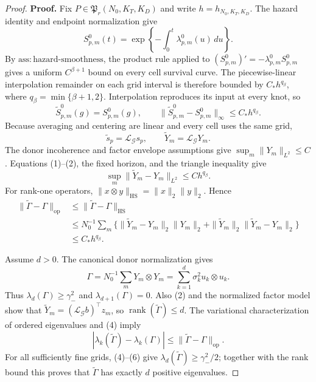 \documentclass{article}
\begin{document}
\begin{proof}
\textbf{Proof.}
Fix \(P\in\mathfrak P_r(N_0,K_T,K_D)\) and write \(h=h_{N_0,K_T,K_D}\). The hazard identity and endpoint normalization give
\[
 S^0_{p,m}(t)=\exp\left\{-\int_0^t\lambda^0_{p,m}(u)\,du\right\}.
\]
By \(\mathrm{ass:hazard\mbox{-}smoothness}\), the product rule applied to \((S^0_{p,m})'=-\lambda^0_{p,m}S^0_{p,m}\) gives a uniform \(C^{\beta+1}\) bound on every cell survival curve. The piecewise-linear interpolation remainder on each grid interval is therefore bounded by \(C_*h^{q_\beta}\), where \(q_\beta=\min\{\beta+1,2\}\). Interpolation reproduces its input at every knot, so
\[
 \widetilde S^0_{p,m}(g)=S^0_{p,m}(g),
 \qquad
 \|\widetilde S^0_{p,m}-S^0_{p,m}\|_\infty\le C_*h^{q_\beta}. \tag{1}
\]
Because averaging and centering are linear and every cell uses the same grid,
\[
 \widetilde s_p=\mathcal L_{\mathcal G}s_p,
 \qquad
 \widetilde Y_m=\mathcal L_{\mathcal G}Y_m. \tag{2}
\]
The donor incoherence and factor envelope assumptions give \(\sup_m\|Y_m\|_{L^2}\le C\). Equations (1)--(2), the fixed horizon, and the triangle inequality give
\[
 \sup_m\|\widetilde Y_m-Y_m\|_{L^2}\le C h^{q_\beta}. \tag{3}
\]
For rank-one operators, \(\|x\otimes y\|_{\mathrm{HS}}=\|x\|_2\|y\|_2\). Hence
\[
 \begin{split}
 \|\widetilde\Gamma-\Gamma\|_{\mathrm{op}}
 &\le \|\widetilde\Gamma-\Gamma\|_{\mathrm{HS}}\\
 &\le N_0^{-1}\sum_m
 \{\|\widetilde Y_m-Y_m\|_2\|Y_m\|_2
   +\|\widetilde Y_m\|_2\|\widetilde Y_m-Y_m\|_2\}\\
 &\le C_*h^{q_\beta}.
 \end{split} \tag{4}
\]

Assume \(d>0\). The canonical donor normalization gives
\[
 \Gamma=N_0^{-1}\sum_mY_m\otimes Y_m
       =\sum_{k=1}^d\sigma_k^2u_k\otimes u_k. \tag{5}
\]
Thus \(\lambda_d(\Gamma)\ge\gamma_-^2\) and \(\lambda_{d+1}(\Gamma)=0\). Also (2) and the normalized factor model show that \(\widetilde Y_m=(\mathcal L_{\mathcal G}b)^{\top}z_m\), so \(\operatorname{rank}(\widetilde\Gamma)\le d\). The variational characterization of ordered eigenvalues and (4) imply
\[
 |\lambda_k(\widetilde\Gamma)-\lambda_k(\Gamma)|
 \le\|\widetilde\Gamma-\Gamma\|_{\mathrm{op}}. \tag{6}
\]
For all sufficiently fine grids, (4)--(6) give \(\lambda_d(\widetilde\Gamma)\ge\gamma_-^2/2\); together with the rank bound this proves that \(\widetilde\Gamma\) has exactly \(d\) positive eigenvalues.


\end{proof}
\end{document}

